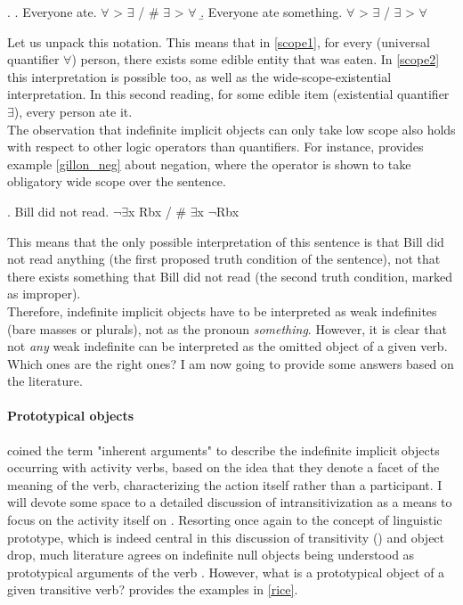 \ex. \label{scope} \a. \label{scope1} Everyone ate. \hfill $\forall$ > $\exists$ / \# $\exists$ > $\forall$
\b. \label{scope2} Everyone ate something. \hfill $\forall$ > $\exists$ / $\exists$ > $\forall$

Let us unpack this notation. This means that in \ref{scope1}, for every (universal quantifier $\forall$) person, there exists some edible entity that was eaten. In \ref{scope2} this interpretation is possible too, as well as the wide-scope-existential interpretation. In this second reading, for some edible item (existential quantifier $\exists$), every person ate it.\\
The observation that indefinite implicit objects can only take low scope also holds with respect to other logic operators than quantifiers. For instance, \textcite[316]{Gillon2012} provides example \ref{gillon_neg} about negation, where the operator is shown to take obligatory wide scope over the sentence.

\ex. \label{gillon_neg} Bill did not read. \hfill $\neg \exists$x Rbx / \# $\exists$x $\neg$Rbx

This means that the only possible interpretation of this sentence is that Bill did not read anything (the first proposed truth condition of the sentence), not that there exists something that Bill did not read (the second truth condition, marked as improper).\\
Therefore, indefinite implicit objects have to be interpreted as weak indefinites (bare masses or plurals), not as the pronoun \textit{something}. However, it is clear that not \textit{any} weak indefinite can be interpreted as the omitted object of a given verb. Which ones are the right ones? I am now going to provide some answers based on the literature.

\paragraph{Prototypical objects}

\textcite[122]{vanvalinlapolla1997syntax} coined the term "inherent arguments" to describe the indefinite implicit objects occurring with activity verbs, based on the idea that they denote a facet of the meaning of the verb, characterizing the action itself rather than a participant. I will devote some space to a detailed discussion of intransitivization as a means to focus on the activity itself on . Resorting once again to the concept of linguistic prototype, which is indeed central in this discussion of transitivity () and object drop, much literature agrees on indefinite null objects being understood as prototypical arguments of the verb \parencite{Rice1988, Naess2007, bresnan1978realistic, Melchin2019, Mittwoch2005, Dvorak2017thesis, Levin1993, Lorenzetti2008, quirk1985grammar}. However, what is a prototypical object of a given transitive verb? \textcite[204]{Rice1988} provides the examples in \ref{rice}.

